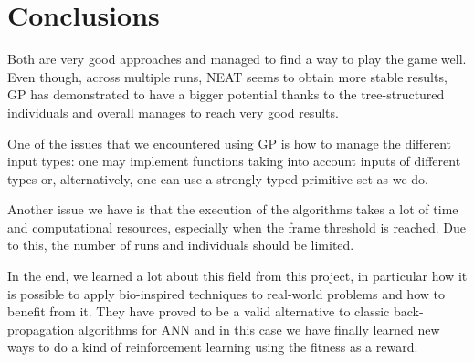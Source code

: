\section{Conclusions}
Both are very good approaches and managed to find a way to play the game well. Even
though, across multiple runs, NEAT seems to obtain more stable results, GP has
demonstrated to have a bigger potential thanks to the tree-structured individuals and overall
manages to reach very good results.

One of the issues that we encountered using GP is how to manage the different input types:
one may implement functions taking into account inputs of different types or, alternatively,
one can use a strongly typed primitive set as we do.

Another issue we have is that the execution of the algorithms takes a lot of time and
computational resources, especially when the frame threshold is reached. Due to this, the
number of runs and individuals should be limited.

In the end, we learned a lot about this field from this project, in particular how it is possible to
apply bio-inspired techniques to real-world problems and how to benefit from it. They have
proved to be a valid alternative to classic back-propagation algorithms for ANN and in this
case we have finally learned new ways to do a kind of reinforcement learning using the
fitness as a reward.